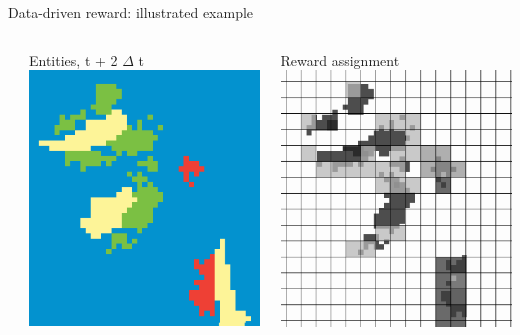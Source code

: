\documentclass[9pt,xcolor=table]{beamer}
\begin{document}
\begin{frame}{Data-driven reward: illustrated example}
\begin{columns}
\begin{column}{0.25\textwidth}
        \end{column}
        \begin{column}{0.25\textwidth}
            Entities, t + 2 $\Delta$ t
            \includegraphics[width=\textwidth,trim={0cm 0cm 0cm 0cm},clip]{img/ep2.png}
        \end{column}
        \begin{column}{0.25\textwidth}
        Reward assignment
            \includegraphics[width=\textwidth,trim={0cm 0cm 0cm 0cm},clip]{img/epreward.png}

\end{column}
\end{columns}
\end{frame}
\end{document}
